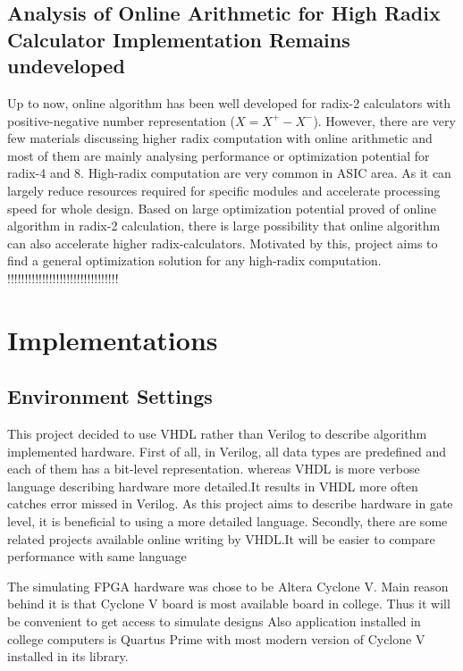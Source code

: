 \documentclass[10pt]{article}
\begin{document}
\subsection{Analysis of Online Arithmetic for High Radix Calculator Implementation Remains undeveloped}

Up to now, online algorithm has been well developed for radix-2 calculators with positive-negative number representation ($X = X^+-X^-$). However, there are very few materials discussing higher radix computation with online arithmetic and most of them are mainly analysing performance or optimization potential for radix-4 and 8. High-radix computation are very common in ASIC area. As it can largely reduce resources required for specific modules and accelerate processing speed for whole design. Based on large optimization potential proved of online algorithm in radix-2 calculation, there is large possibility that online algorithm can also accelerate higher radix-calculators. Motivated by this, project aims to find a general optimization solution for any  high-radix computation. !!!!!!!!!!!!!!!!!!!!!!!!!!!!!!!!



\section{Implementations}

\subsection{Environment Settings}

This project decided to use VHDL rather than Verilog to describe algorithm implemented hardware. First of all, in Verilog, all data types are predefined and each of them has a bit-level representation\cite{c10}. whereas VHDL is more verbose language describing hardware more detailed.It results in VHDL more often catches error missed in Verilog. As this project aims to describe hardware in gate level, it is beneficial to using a more detailed language. Secondly, there are some related projects available online writing by VHDL.It will be easier to compare performance with same language

The simulating FPGA hardware was chose to be Altera Cyclone V. Main reason behind it is that Cyclone V board is most available board in college. Thus it will be convenient to get access to simulate designs Also application installed in college computers is Quartus Prime with most modern version of Cyclone V installed in its library. 
\end{document}
